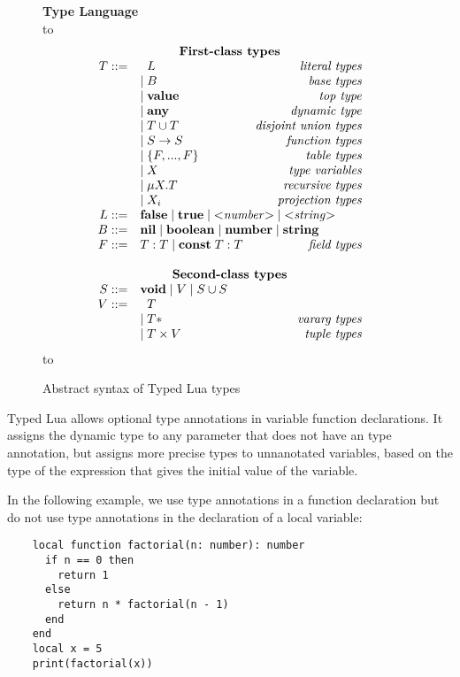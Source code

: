 \documentclass[preprint]{sig-alternate}
\newcommand{\Any}{\mathbf{any}}
\newcommand{\Top}{\mathbf{value}}
\newcommand{\Nil}{\mathbf{nil}}
\newcommand{\False}{\mathbf{false}}
\newcommand{\True}{\mathbf{true}}
\newcommand{\Boolean}{\mathbf{boolean}}
\newcommand{\Number}{\mathbf{number}}
\newcommand{\String}{\mathbf{string}}
\newcommand{\Void}{\mathbf{void}}
\newcommand{\Const}{\mathbf{const}}
\def\dstart{\hbox to \hsize{\vrule depth 4pt\hrulefill\vrule depth 4pt}}
\def\dend{\hbox to \hsize{\vrule height 4pt\hrulefill\vrule height 4pt}}
\begin{document}
\begin{figure}[!ht]
\textbf{Type Language}\\
\dstart
$$
\begin{array}{rlr}
\multicolumn{3}{c}{\textbf{First-class types}} \\
T ::= & \;\; L & \textit{literal types}\\
& | \; B & \textit{base types}\\
& | \; \Top & \textit{top type}\\
& | \; \Any & \textit{dynamic type}\\
& | \; T \cup T & \textit{disjoint union types}\\
& | \; S \rightarrow S & \textit{function types}\\
& | \; \{F, ..., F\} & \textit{table types}\\
& | \; X & \textit{type variables}\\
& | \; \mu X.T & \textit{recursive types}\\
& | \; X_i & \textit{projection types}\\
L ::= & \multicolumn{2}{l}{\False \; | \; \True \; | \; {<}{\it number}{>} \; | \; {<}{\it string}{>} } \\
B ::= & \multicolumn{2}{l}{\Nil \; | \; \Boolean \; | \; \Number \; | \; \String} \\
F ::= & T:T \; | \; \Const \; T:T & \textit{field types} \\
\multicolumn{3}{c}{} \\
\multicolumn{3}{c}{\textbf{Second-class types}} \\
S ::= &  \multicolumn{2}{l}{\Void \; |\; V \; | \; S \cup S} \\
V ::= & \;\; T & \\
& | \; T* & \textit{vararg types}\\
& | \; T \times V & \textit{tuple types}
\end{array}
$$
\dend
\caption{Abstract syntax of Typed Lua types}
\label{fig:typelang}
\end{figure}

Typed Lua allows optional type annotations in variable function
declarations. It assigns the dynamic type to any parameter that
does not have an type annotation, but assigns more precise
types to unnanotated variables, based on the type of the
expression that gives the initial value of the variable.

In the following example, we use type annotations in a function
declaration but do not use type annotations in the declaration
of a local variable:
\begin{verbatim}
    local function factorial(n: number): number
      if n == 0 then
        return 1
      else
        return n * factorial(n - 1)
      end
    end
    local x = 5
    print(factorial(x))
\end{verbatim}
\end{document}
